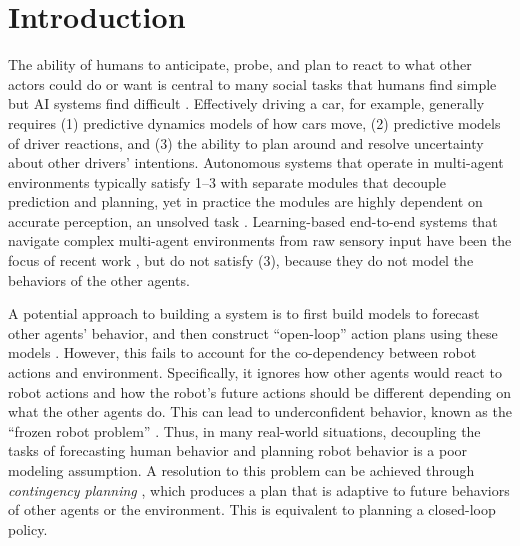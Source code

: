 \documentclass[conference]{IEEEtran}
\begin{document}
\section{Introduction}

The ability of humans to 
anticipate, probe, and plan to react to what other actors could do or want
is central to many social tasks that humans find simple but AI systems find difficult \citep[]{russell2019human}. Effectively driving a car,
for example, generally requires (1) predictive dynamics models of how cars move, (2) predictive models of driver reactions,
and (3) the ability to plan around and resolve uncertainty about other drivers' intentions.
Autonomous systems that operate in multi-agent environments typically satisfy 1--3 with separate modules that decouple prediction and planning, yet in practice the modules are highly dependent on accurate perception, an unsolved task \citep{thrun2006stanley,urmson2008autonomous,paden2016survey}.
Learning-based end-to-end systems that navigate complex multi-agent environments from raw sensory input have been the focus of recent work \citep{rhinehart2020deep,zeng2019end,filos2020can}, but do not satisfy (3), because they do not model the behaviors of the other agents.

A potential approach to building a system is to first build models to forecast other agents' behavior, and then construct ``open-loop'' action plans using these models \cite{thompson2009probabilistic,ziebart2009planning}.
However, this fails to account for the co-dependency between robot actions and environment.
Specifically, it ignores how other agents would react to robot actions and how the robot's future actions should be different depending on what the other agents do. This can lead to underconfident behavior, known as the ``frozen robot problem'' \citep{trautman_unfreezing_2010}. Thus, in many real-world situations, decoupling the tasks of forecasting human behavior and planning robot behavior is a poor modeling assumption. A resolution to this problem can be achieved through \emph{contingency planning} \citep{hardy2013contingency,zhan2016non,galceran2017multipolicy,fisac2019hierarchical},  which produces a plan that is adaptive to future behaviors of other agents or the environment. This is equivalent to planning a closed-loop policy.
\end{document}

